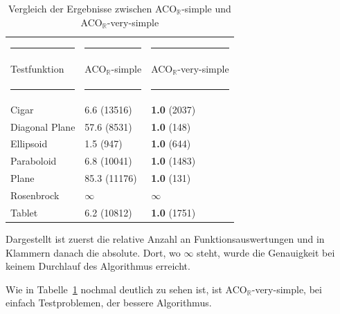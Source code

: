 \documentclass[fontsize=12, a4aper]{scrartcl}
\begin{document}
	\begin{table}[H]
		
		\fontsize{10pt}{12pt}
		
		\caption{Vergleich der Ergebnisse zwischen ACO\(_{\mathbb{R}}\)-simple und ACO\(_{\mathbb{R}}\)-very-simple}
		
		\label{VerglelichACORSimpleundACORVerySimple}
		
		\begin{tabularx}{\textwidth}{l|l|l}
			
			\rule{4.8cm}{0.4pt} & \rule{4.8cm}{0.4pt} & \rule{4.8cm}{0.4pt}\\
			
			Testfunktion & ACO\(_{\mathbb{R}}\)-simple & ACO\(_{\mathbb{R}}\)-very-simple\\
			
			\rule{4.8cm}{0.4pt} & \rule{4.8cm}{0.4pt} & \rule{4.8cm}{0.4pt}\\
			
			Cigar & 6.6 (13516) & \textbf{1.0} (2037) \\
			
			Diagonal Plane & 57.6 (8531) & \textbf{1.0} (148) \\
			
			Ellipsoid & 1.5 (947) & \textbf{1.0} (644) \\
			
			Paraboloid & 6.8 (10041) & \textbf{1.0} (1483) \\
			
			Plane & 85.3 (11176) & \textbf{1.0} (131) \\
			
			Rosenbrock & \(\infty\) & \(\infty\)\\
			
			Tablet & 6.2 (10812) & \textbf{1.0} (1751) 
			
		\end{tabularx}
		
		\smallskip
		
		Dargestellt ist zuerst die relative Anzahl an Funktionsauswertungen und in Klammern danach die absolute. Dort, wo \(\infty\) steht, wurde die Genauigkeit bei keinem Durchlauf des Algorithmus erreicht.\hfill\newline
		
	\end{table}

	Wie in Tabelle~\ref{VerglelichACORSimpleundACORVerySimple} nochmal deutlich zu sehen ist, ist ACO\(_{\mathbb{R}}\)-very-simple, bei einfach Testproblemen, der bessere Algorithmus.
	
\end{document}
